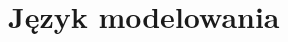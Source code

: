\documentclass{pracamgr}
\theoremstyle{plain}
\begin{document}
 
\chapter{Język modelowania}



{}






\end{document}

